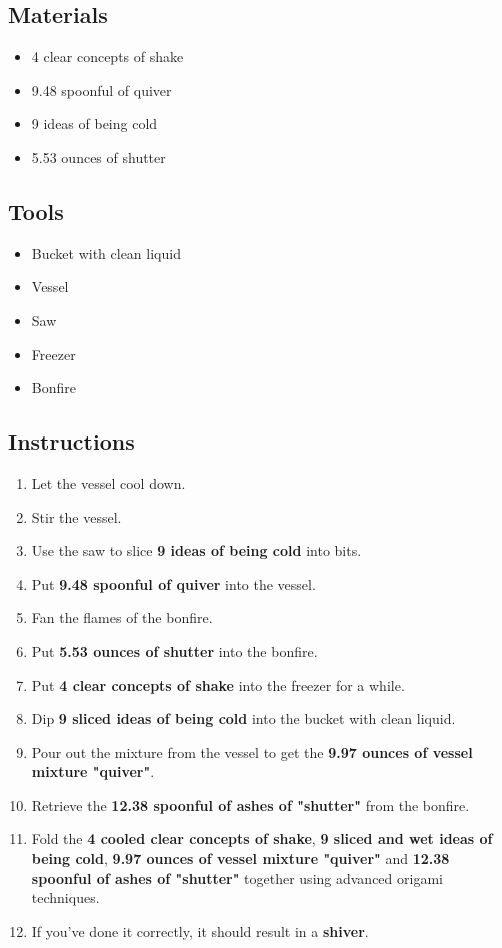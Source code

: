 \documentclass{article}
\begin{document}
\subsection{Materials}\begin{itemize}
\item 
4 clear concepts of shake
\item 
9.48 spoonful of quiver
\item 
9 ideas of being cold
\item 
5.53 ounces of shutter
\end{itemize}
\subsection{Tools}\begin{itemize}
\item 
Bucket with clean liquid
\item 
Vessel
\item 
Saw
\item 
Freezer
\item 
Bonfire
\end{itemize}
\subsection{Instructions}\begin{enumerate}
\item 
Let the vessel cool down.
\item 
Stir the vessel.
\item 
Use the saw to slice \textbf{9 ideas of being cold} into bits.
\item 
Put \textbf{9.48 spoonful of quiver} into the vessel.
\item 
Fan the flames of the bonfire.
\item 
Put \textbf{5.53 ounces of shutter} into the bonfire.
\item 
Put \textbf{4 clear concepts of shake} into the freezer for a while.
\item 
Dip \textbf{9 sliced ideas of being cold} into the bucket with clean liquid.
\item 
Pour out the mixture from the vessel to get the \textbf{9.97 ounces of vessel mixture "quiver"}.
\item 
Retrieve the \textbf{12.38 spoonful of ashes of "shutter"} from the bonfire.
\item 
Fold the \textbf{4 cooled clear concepts of shake}, \textbf{9 sliced and wet ideas of being cold}, \textbf{9.97 ounces of vessel mixture "quiver"} and \textbf{12.38 spoonful of ashes of "shutter"} together using advanced origami techniques.
\item 
If you've done it correctly, it should result in a \textbf{shiver}.
\end{enumerate}
\newpage
\end{document}
